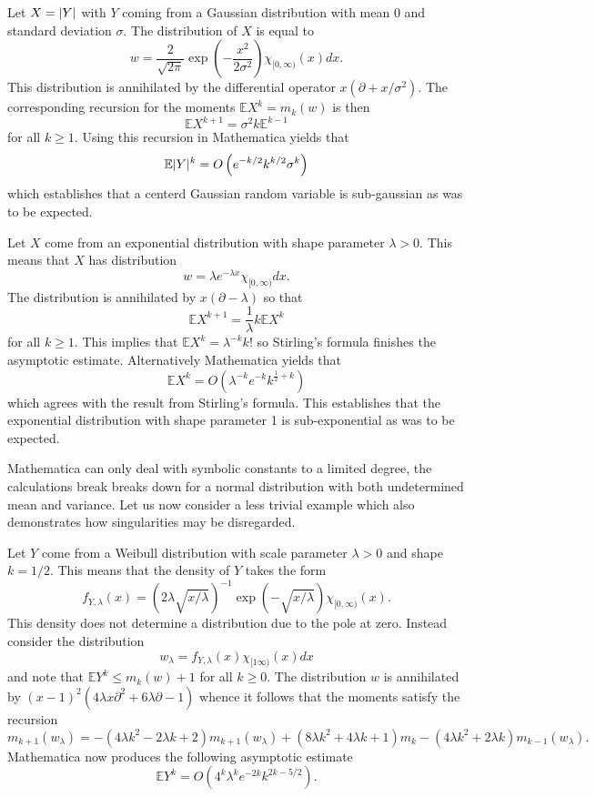 \begin{example}
  Let $X=\vert Y \vert$ with $Y$ coming from a Gaussian distribution with mean $0$ and standard deviation $\sigma$.
  The distribution of $X$ is equal to
  $$w = \frac{2}{\sqrt{2\pi}}\exp\left(-\frac{x^2}{2\sigma^2}\right)\chi_{[0,\infty)}(x)dx.$$
  This distribution is annihilated by the differential operator $x(\partial + x/\sigma^2).$
  The corresponding recursion for the moments $\mathbb{E}X^k = m_k(w)$ is then
  $$\mathbb{E}X^{k+1}= \sigma^2 k\mathbb{E}^{k-1} $$
  for all $k\geq 1$.
  Using this recursion in Mathematica yields that
  $$\mathbb{E}\vert Y \vert^{k} = O\left(e^{-k/2}k^{k/2}\sigma^k\right) $$
  which establishes that a centerd Gaussian random variable is sub-gaussian as was to be expected.
\end{example}
\begin{example}
  Let $X$ come from an exponential distribution with shape parameter $\lambda>0$.
  This means that $X$ has distribution
  $$w =  \lambda e^{-\lambda x} \chi_{[0,\infty)} dx.$$
  The distribution is annihilated by $x(\partial - \lambda )$ so that
  $$\mathbb{E}X^{k+1}= \frac{1}{\lambda}k\mathbb{E}X^k$$
  for all $k\geq 1$.
  This implies that $\mathbb{E}X^k = \lambda^{-k}k!$ so Stirling's formula finishes the asymptotic estimate.
  Alternatively Mathematica yields that
  $$\mathbb{E}X^k = O(\lambda^{-k}e^{-k}k^{\frac{1}{2} + k}) $$
  which agrees with the result from Stirling's formula.
  This establishes that the exponential distribution with shape parameter 1 is sub-exponential as was to be expected.
\end{example}
Mathematica can only deal with symbolic constants to a limited degree, the calculations break breaks down for a normal distribution with both undetermined mean and variance.
Let us now consider a less trivial example which also demonstrates how singularities may be disregarded.
\begin{example}
  Let $Y$ come from a Weibull distribution with scale parameter $\lambda>0$ and shape $k = 1/2$.
  This means that the density of $Y$ takes the form
  $$f_{Y,\lambda}(x) = (2 \lambda \sqrt{x/\lambda})^{-1}\exp(-\sqrt{x/\lambda})\chi_{[0,\infty)}(x).$$
  This density does not determine a distribution due to the pole at zero.
  Instead consider the distribution
  $$w_\lambda = f_{Y,\lambda}(x)\chi_{[1\infty)}(x)dx $$
  and note that $\mathbb{E}Y^k \leq m_k(w) + 1$ for all $k\geq 0$.
  The distribution $w$ is annihilated by $(x-1)^2(4 \lambda x \partial^2 + 6\lambda\partial - 1)$
  whence it follows that the moments satisfy the recursion
  $$m_{k+1}(w_\lambda) = -(4\lambda k^2 - 2\lambda k + 2)m_{k+1}(w_\lambda) + (8\lambda k^2 + 4\lambda k + 1)m_k - (4\lambda k^2 + 2\lambda k)m_{k-1}(w_\lambda).$$
  Mathematica now produces the following asymptotic estimate
  $$\mathbb{E}Y^k = O\left(4^k\lambda^k e^{-2k}k^{2k -5/2}\right).$$
\end{example}
